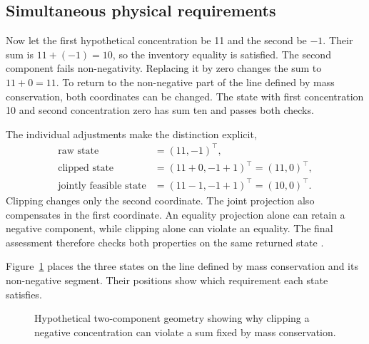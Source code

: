 \subsection{Simultaneous physical requirements}

Now let the first hypothetical concentration be 11 and the second be $-1$. Their sum is $11+(-1)=10$, so the inventory equality is satisfied. The second component fails non-negativity. Replacing it by zero changes the sum to $11+0=11$. To return to the non-negative part of the line defined by mass conservation, both coordinates can be changed. The state with first concentration 10 and second concentration zero has sum ten and passes both checks.

The individual adjustments make the distinction explicit,
\[
\begin{aligned}
\text{raw state}&=(11,-1)^\top,\\
\text{clipped state}&=(11+0,-1+1)^\top=(11,0)^\top,\\
\text{jointly feasible state}&=(11-1,-1+1)^\top=(10,0)^\top.
\end{aligned}
\]
Clipping changes only the second coordinate. The joint projection also compensates in the first coordinate. An equality projection alone can retain a negative component, while clipping alone can violate an equality. The final assessment therefore checks both properties on the same returned state \citep{KircherVotsmeier2025,Haddad2010}.

Figure~\ref{fig:assessment_feasible_segment} places the three states on the line defined by mass conservation and its non-negative segment. Their positions show which requirement each state satisfies.

\begin{figure}[htbp]
\centering
{}
\caption{Hypothetical two-component geometry showing why clipping a negative concentration can violate a sum fixed by mass conservation.}
\label{fig:assessment_feasible_segment}
\end{figure}

